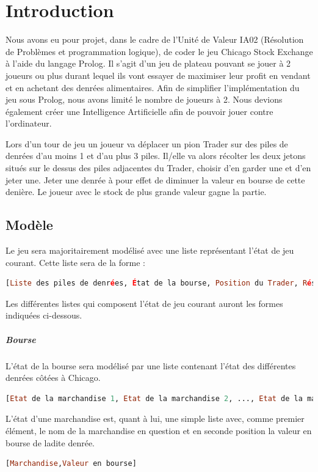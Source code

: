 \documentclass[a4paper, 11pt,twoside, leqno]{report}
\theoremstyle{plain}
\begin{document}
\chapter{Introduction}

Nous avons eu pour projet, dans le cadre de l'Unité de Valeur IA02 (Résolution de Problèmes et programmation logique), de coder le jeu Chicago Stock Exchange à l'aide du langage Prolog. Il s'agit d'un jeu de plateau pouvant se jouer à 2 joueurs ou plus durant lequel ils vont essayer de maximiser leur profit en vendant et en achetant des denrées alimentaires. 
Afin de simplifier l'implémentation du jeu sous Prolog, nous avons limité le nombre de joueurs à 2. Nous devions également créer une Intelligence Artificielle afin de pouvoir jouer contre l'ordinateur. 

Lors d'un tour de jeu un joueur va déplacer un pion Trader sur des piles de denrées d'au moins 1 et d'au plus 3 piles. Il/elle va alors récolter les deux jetons situés sur le dessus des piles adjacentes du Trader, choisir d'en garder une et d'en jeter une. Jeter une denrée à pour effet de diminuer la valeur en bourse de cette denière. Le joueur avec le stock de plus grande valeur gagne la partie.\\


\section{Modèle}
\noindent Le jeu sera majoritairement modélisé avec une liste représentant l'état de jeu courant. Cette liste sera de la forme : 
\begin{lstlisting}[language=prolog]
[Liste des piles de denrées, État de la bourse, Position du Trader, Réserve du joueur 1, Réserve du joueur 2]
\end{lstlisting}
Les différentes listes qui composent l'état de jeu courant auront les formes indiquées ci-dessous.
\paragraph{Bourse} L'état de la bourse sera modélisé par une liste contenant l'état des différentes denrées côtées à Chicago.
\begin{lstlisting}[language=prolog]
[Etat de la marchandise 1, Etat de la marchandise 2, ..., Etat de la marchandise n]
\end{lstlisting}
L'état d'une marchandise est, quant à lui, une simple liste avec, comme premier élément, le nom de la marchandise en question et en seconde position la valeur en bourse de ladite denrée.
\begin{lstlisting}[language=prolog]
[Marchandise,Valeur en bourse]
\end{lstlisting}
\end{document}
